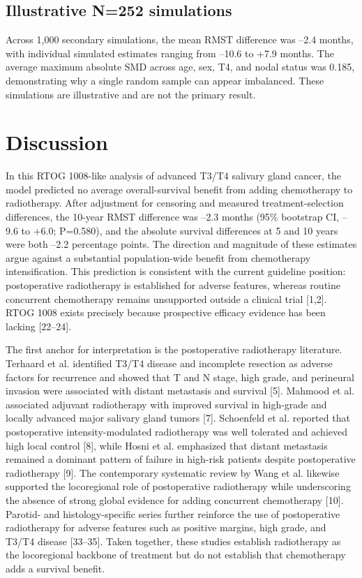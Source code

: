 \documentclass[9pt,twocolumn]{extarticle}
\begin{document}
\subsection{Illustrative N=252 simulations}
Across 1,000 secondary simulations, the mean RMST difference was --2.4 months, with individual simulated estimates ranging from --10.6 to +7.9 months. The average maximum absolute SMD across age, sex, T4, and nodal status was 0.185, demonstrating why a single random sample can appear imbalanced. These simulations are illustrative and are not the primary result.\par
\section{Discussion}
In this RTOG 1008-like analysis of advanced T3/T4 salivary gland cancer, the model predicted no average overall-survival benefit from adding chemotherapy to radiotherapy. After adjustment for censoring and measured treatment-selection differences, the 10-year RMST difference was --2.3 months (95\% bootstrap CI, --9.6 to +6.0; P=0.580), and the absolute survival differences at 5 and 10 years were both --2.2 percentage points. The direction and magnitude of these estimates argue against a substantial population-wide benefit from chemotherapy intensification. This prediction is consistent with the current guideline position: postoperative radiotherapy is established for adverse features, whereas routine concurrent chemotherapy remains unsupported outside a clinical trial [1,2]. RTOG 1008 exists precisely because prospective efficacy evidence has been lacking [22--24].\par
The first anchor for interpretation is the postoperative radiotherapy literature. Terhaard et al. identified T3/T4 disease and incomplete resection as adverse factors for recurrence and showed that T and N stage, high grade, and perineural invasion were associated with distant metastasis and survival [5]. Mahmood et al. associated adjuvant radiotherapy with improved survival in high-grade and locally advanced major salivary gland tumors [7]. Schoenfeld et al. reported that postoperative intensity-modulated radiotherapy was well tolerated and achieved high local control [8], while Hosni et al. emphasized that distant metastasis remained a dominant pattern of failure in high-risk patients despite postoperative radiotherapy [9]. The contemporary systematic review by Wang et al. likewise supported the locoregional role of postoperative radiotherapy while underscoring the absence of strong global evidence for adding concurrent chemotherapy [10]. Parotid- and histology-specific series further reinforce the use of postoperative radiotherapy for adverse features such as positive margins, high grade, and T3/T4 disease [33--35]. Taken together, these studies establish radiotherapy as the locoregional backbone of treatment but do not establish that chemotherapy adds a survival benefit.\par
\end{document}
